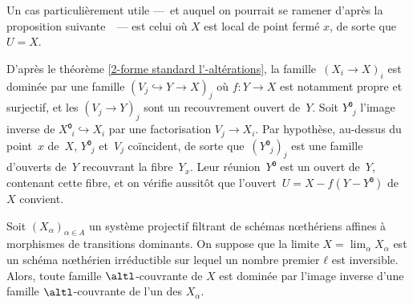\documentclass[10pt]{../fichiers-configuration-latex/smfart}
\begin{document}
Un cas particulièrement utile — et auquel on pourrait se
ramener d'après la proposition suivante  — est celui où
$X$ est local de point fermé $x$, de sorte que $U=X$.

\begin{démo}
D'après le théorème \ref{2-forme standard l'-altérations},
la famille $(X_i→X)_i$ est dominée
par une famille $(V_j↪Y→X)_j$ où $f:Y→X$ est notamment
propre et surjectif, et les $(V_j→Y)_j$ sont un recouvrement ouvert de $Y$. Soit $Y⁰_j$ l'image
inverse de $X⁰_i↪X_i$ par une factorisation $V_j→X_i$.
Par hypothèse, au-dessus du point $x$ de $X$, $Y⁰_j$ et $V_j$
coïncident, de sorte que $(Y⁰_j)_j$ est une famille d'ouverts
de $Y$ recouvrant la fibre $Y_x$. Leur réunion $Y⁰$ est un ouvert
de $Y$, contenant cette fibre, et on vérifie aussitôt que l'ouvert $U=X-f(Y-Y⁰)$
de $X$ convient.
\end{démo}

\begin{proposition2}\label{2-famille alt-couvrante et passage à la limite}
Soit $(X_α)_{α∈A}$ un système projectif filtrant de schémas
nœthériens affines à morphismes de transitions dominants. 
On suppose que la limite $X=\lim_α X_α$ est un schéma nœthérien
irréductible sur lequel un nombre premier $ℓ$ est inversible. 
Alors, toute famille $\altl$-couvrante de $X$ est dominée par l'image
inverse d'une famille $\altl$-couvrante de l'un des $X_α$.
\end{proposition2}
\end{document}
